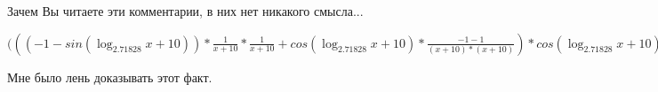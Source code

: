 \documentclass[12pt,a4paper,fleqn]{article}
\theoremstyle{definition}
\begin{document}
Зачем Вы читаете эти комментарии, в них нет никакого смысла...

$((( -1  - sin(\log_{ 2.71828 }{ x  +  10 })) * \frac{ 1 }{ x  +  10 }
 * \frac{ 1 }{ x  +  10 }
 + cos(\log_{ 2.71828 }{ x  +  10 }) * \frac{ -1  -  1 }{( x  +  10 ) * ( x  +  10 )}
) * cos(\log_{ 2.71828 }{ x  +  10 }) * \frac{ 1 }{ x  +  10 }
 * { 3 }^{sin(\log_{ 2.71828 }{ x  +  10 })} + cos(\log_{ 2.71828 }{ x  +  10 }) * \frac{ 1 }{ x  +  10 }
 * ((( -1  - sin(\log_{ 2.71828 }{ x  +  10 })) * \frac{ 1 }{ x  +  10 }
 * \frac{ 1 }{ x  +  10 }
 + cos(\log_{ 2.71828 }{ x  +  10 }) * \frac{ -1  -  1 }{( x  +  10 ) * ( x  +  10 )}
) * { 3 }^{sin(\log_{ 2.71828 }{ x  +  10 })} + cos(\log_{ 2.71828 }{ x  +  10 }) * \frac{ 1 }{ x  +  10 }
 * cos(\log_{ 2.71828 }{ x  +  10 }) * \frac{ 1 }{ x  +  10 }
 * { 3 }^{sin(\log_{ 2.71828 }{ x  +  10 })}) = (( -1  - sin(\log_{ 2.71828 }{ x  +  10 })) * \frac{ 1 }{ x  +  10 }
 * \frac{ 1 }{ x  +  10 }
 + cos(\log_{ 2.71828 }{ x  +  10 }) * \frac{ -1  -  1 }{( x  +  10 ) * ( x  +  10 )}
) * cos(\log_{ 2.71828 }{ x  +  10 }) * \frac{ 1 }{ x  +  10 }
 * { 3 }^{sin(\log_{ 2.71828 }{ x  +  10 })} + cos(\log_{ 2.71828 }{ x  +  10 }) * \frac{ 1 }{ x  +  10 }
 * ((( -1  - sin(\log_{ 2.71828 }{ x  +  10 })) * \frac{ 1 }{ x  +  10 }
 * \frac{ 1 }{ x  +  10 }
 + cos(\log_{ 2.71828 }{ x  +  10 }) * \frac{ -1  -  1 }{( x  +  10 ) * ( x  +  10 )}
) * { 3 }^{sin(\log_{ 2.71828 }{ x  +  10 })} + cos(\log_{ 2.71828 }{ x  +  10 }) * \frac{ 1 }{ x  +  10 }
 * cos(\log_{ 2.71828 }{ x  +  10 }) * \frac{ 1 }{ x  +  10 }
 * { 3 }^{sin(\log_{ 2.71828 }{ x  +  10 })})$

Мне было лень доказывать этот факт.
\end{document}
